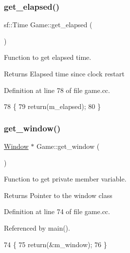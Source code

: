 \subsubsection{\texorpdfstring{get\+\_\+elapsed()}{get\_elapsed()}}
{\footnotesize\ttfamily sf\+::\+Time Game\+::get\+\_\+elapsed (\begin{DoxyParamCaption}{ }\end{DoxyParamCaption})}



Function to get elapsed time. 

\begin{DoxyReturn}{Returns}
Elapsed time since clock restart 
\end{DoxyReturn}


Definition at line 78 of file game.\+cc.


\begin{DoxyCode}
78                          \{
79     \textcolor{keywordflow}{return}(m\_elapsed);
80 \}
\end{DoxyCode}
\mbox{\label{class_game_ada27344ddafc8489f4d6ab5ec6cd9a8e}} 
\subsubsection{\texorpdfstring{get\+\_\+window()}{get\_window()}}
{\footnotesize\ttfamily \hyperlink{class_window}{Window} $\ast$ Game\+::get\+\_\+window (\begin{DoxyParamCaption}{ }\end{DoxyParamCaption})}



Function to get private member variable. 

\begin{DoxyReturn}{Returns}
Pointer to the window class 
\end{DoxyReturn}


Definition at line 74 of file game.\+cc.



Referenced by main().


\begin{DoxyCode}
74                          \{
75     \textcolor{keywordflow}{return}(&m\_window);
76 \}
\end{DoxyCode}
\mbox{\label{class_game_a698430daa658033e7746e3a161a859a9}} 
